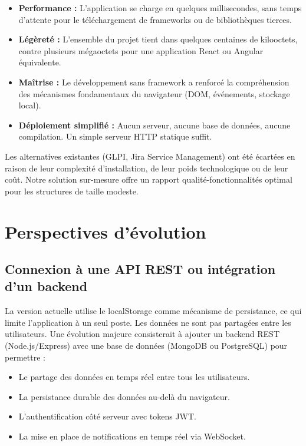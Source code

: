 \documentclass[12pt,a4paper,twoside]{report}
\begin{document}
\begin{itemize}
    \item \textbf{Performance :} L'application se charge en quelques millisecondes, sans temps d'attente pour le téléchargement de frameworks ou de bibliothèques tierces.
    \item \textbf{Légèreté :} L'ensemble du projet tient dans quelques centaines de kilooctets, contre plusieurs mégaoctets pour une application React ou Angular équivalente.
    \item \textbf{Maîtrise :} Le développement sans framework a renforcé la compréhension des mécanismes fondamentaux du navigateur (DOM, événements, stockage local).
    \item \textbf{Déploiement simplifié :} Aucun serveur, aucune base de données, aucune compilation. Un simple serveur HTTP statique suffit.
\end{itemize}

Les alternatives existantes (GLPI, Jira Service Management) ont été écartées en raison de leur complexité d'installation, de leur poids technologique ou de leur coût. Notre solution sur-mesure offre un rapport qualité-fonctionnalités optimal pour les structures de taille modeste.

\section{Perspectives d'évolution}

\subsection{Connexion à une API REST ou intégration d'un backend}

La version actuelle utilise le localStorage comme mécanisme de persistance, ce qui limite l'application à un seul poste. Les données ne sont pas partagées entre les utilisateurs. Une évolution majeure consisterait à ajouter un backend REST (Node.js/Express) avec une base de données (MongoDB ou PostgreSQL) pour permettre :

\begin{itemize}
    \item Le partage des données en temps réel entre tous les utilisateurs.
    \item La persistance durable des données au-delà du navigateur.
    \item L'authentification côté serveur avec tokens JWT.
    \item La mise en place de notifications en temps réel via WebSocket.
\end{itemize}
\end{document}
